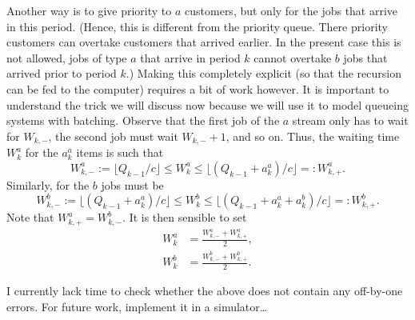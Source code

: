 \begin{question}
\begin{solution}
    Another way is to give priority to $a$ customers, but only for the
    jobs that arrive in this period. (Hence, this is different from
    the priority queue. There priority customers can overtake
    customers that arrived earlier. In the present case this is not
    allowed, jobs of type $a$ that arrive in period $k$ cannot
    overtake $b$ jobs that arrived prior to period $k$.)  Making this
    completely explicit (so that the recursion can be fed to the
    computer) requires a bit of work however.  It is important to
    understand the trick we will discuss now because we will use it to
    model queueing systems with batching. Observe that the first job
    of the $a$ stream only has to wait for $W_{k,-}$, the second job
    must wait $W_{k,-}+1$, and so on. Thus, the waiting time $W_{k}^a$
    for the $a_k^a$ items is such that
    \begin{equation*}
W_{k,-}^a:= \lfloor Q_{k-1}/c \rfloor \leq  W_{k}^a \leq \lfloor (Q_{k-1}+a_k^a)/c \rfloor =: W_{k,+}^a.
    \end{equation*}
    Similarly, for the $b$ jobs must be
    \begin{equation*}
W_{k,-}^b := \lfloor (Q_{k-1}+a_k^a)/c \rfloor \leq  W_{k}^b \leq \lfloor (Q_{k-1}+a_k^a+a_k^b)/c \rfloor =: W_{k,+}^b.
    \end{equation*}
Note that $W_{k,+}^a = W_{k,-}^b$. 
It is then sensible to set 
\begin{align*}
  W_{k}^a &= \frac{W_{k,-}^a + W_{k,+}^a}2, \\
  W_{k}^b &= \frac{W_{k,-}^b + W_{k,+}^b}2.
\end{align*}

\tbd I currently lack time to check whether the above does not contain
any off-by-one errors. For future work, implement it in a simulator\ldots


  \end{solution}
\end{question}



